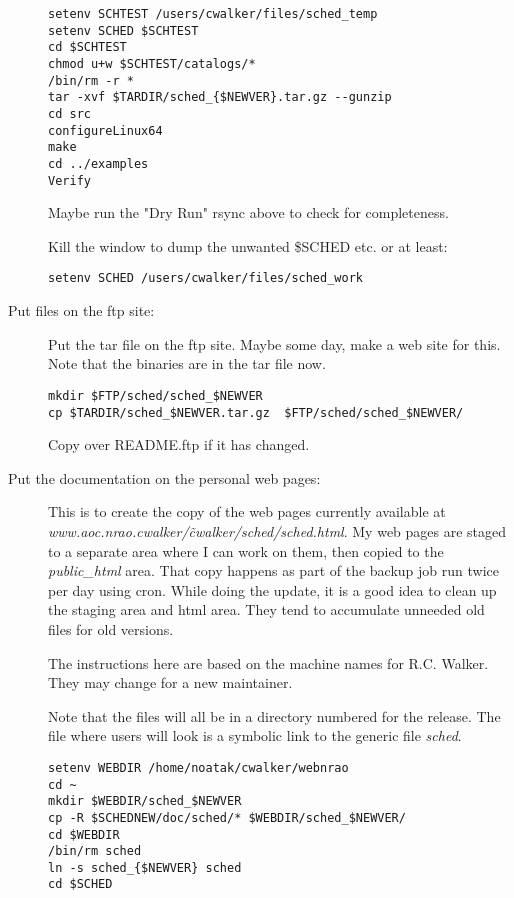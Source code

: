 \documentclass{report}
\begin{document}
\begin{description}
\begin{verbatim}
setenv SCHTEST /users/cwalker/files/sched_temp
setenv SCHED $SCHTEST
cd $SCHTEST
chmod u+w $SCHTEST/catalogs/*
/bin/rm -r *
tar -xvf $TARDIR/sched_{$NEWVER}.tar.gz --gunzip
cd src
configureLinux64
make
cd ../examples
Verify
\end{verbatim}


Maybe run the "Dry Run" rsync above to check for completeness.

     Kill the window to dump the unwanted \$SCHED etc. or at least:
\begin{verbatim}
setenv SCHED /users/cwalker/files/sched_work
\end{verbatim}


\item [Put files on the ftp site:]

Put the tar file on the ftp site.  Maybe some day, make a web site
for this.   Note that the binaries are in the tar
file now.

\begin{verbatim}
mkdir $FTP/sched/sched_$NEWVER
cp $TARDIR/sched_$NEWVER.tar.gz  $FTP/sched/sched_$NEWVER/
\end{verbatim}

Copy over README.ftp if it has changed.

\item [Put the documentation on the personal web pages:]

This is to create the copy of the web pages currently available at
{\sl www.aoc.nrao.cwalker/\~cwalker/sched/sched.html}.  My web pages
are staged to a separate area where I can work on them, then copied to
the {\sl public\_html} area.  That copy happens as part of the backup
job run twice per day using cron.  While doing the update, it is a
good idea to clean up the staging area and html area.  They tend to
accumulate unneeded old files for old versions.

The instructions here are based on the machine names for R.C. Walker.
They may change for a new maintainer.

Note that the files will all be in a directory numbered for the
release.  The file where users will look is a symbolic link to the
generic file {\sl sched}.

\begin{verbatim}
setenv WEBDIR /home/noatak/cwalker/webnrao
cd ~
mkdir $WEBDIR/sched_$NEWVER
cp -R $SCHEDNEW/doc/sched/* $WEBDIR/sched_$NEWVER/
cd $WEBDIR
/bin/rm sched
ln -s sched_{$NEWVER} sched
cd $SCHED
\end{verbatim}



\end{description}
\end{document}
